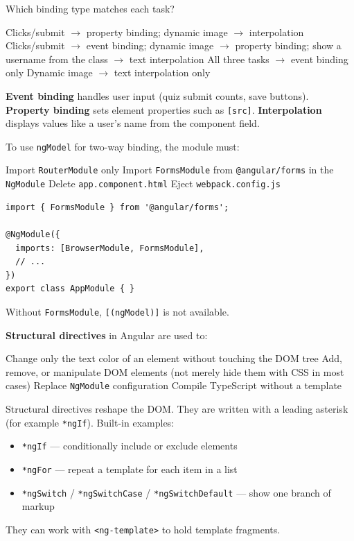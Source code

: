 \question[4]
Which binding type matches each task?
\begin{choices}
  \choice Clicks/submit $\rightarrow$ property binding; dynamic image $\rightarrow$ interpolation
  \CorrectChoice Clicks/submit $\rightarrow$ event binding; dynamic image $\rightarrow$ property binding; show a username from the class $\rightarrow$ text interpolation
  \choice All three tasks $\rightarrow$ event binding only
  \choice Dynamic image $\rightarrow$ text interpolation only
\end{choices}
\begin{solution}
  \textbf{Event binding} handles user input (quiz submit counts, save buttons). \textbf{Property binding} sets element properties such as \lstinline[style=htmlinline]|[src]|. \textbf{Interpolation} displays values like a user's name from the component field.
\end{solution}

\question[4]
To use \texttt{ngModel} for two-way binding, the module must:
\begin{choices}
  \choice Import \texttt{RouterModule} only
  \CorrectChoice Import \texttt{FormsModule} from \texttt{@angular/forms} in the \texttt{NgModule}
  \choice Delete \texttt{app.component.html}
  \choice Eject \texttt{webpack.config.js}
\end{choices}
\begin{solution}
\begin{lstlisting}[style=ts]
import { FormsModule } from '@angular/forms';

@NgModule({
  imports: [BrowserModule, FormsModule],
  // ...
})
export class AppModule { }
\end{lstlisting}
  Without \texttt{FormsModule}, \lstinline[style=htmlinline]|[(ngModel)]| is not available.
\end{solution}

\question[4]
\textbf{Structural directives} in Angular are used to:
\begin{choices}
  \choice Change only the text color of an element without touching the DOM tree
  \CorrectChoice Add, remove, or manipulate DOM elements (not merely hide them with CSS in most cases)
  \choice Replace \texttt{NgModule} configuration
  \choice Compile TypeScript without a template
\end{choices}
\begin{solution}
  Structural directives reshape the DOM. They are written with a leading asterisk (for example \lstinline[style=htmlinline]|*ngIf|). Built-in examples:
  \begin{itemize}
    \item \lstinline[style=htmlinline]|*ngIf| --- conditionally include or exclude elements
    \item \lstinline[style=htmlinline]|*ngFor| --- repeat a template for each item in a list
    \item \lstinline[style=htmlinline]|*ngSwitch| / \lstinline[style=htmlinline]|*ngSwitchCase| / \lstinline[style=htmlinline]|*ngSwitchDefault| --- show one branch of markup
  \end{itemize}
  They can work with \lstinline[style=htmlinline]{<ng-template>} to hold template fragments.
\end{solution}


